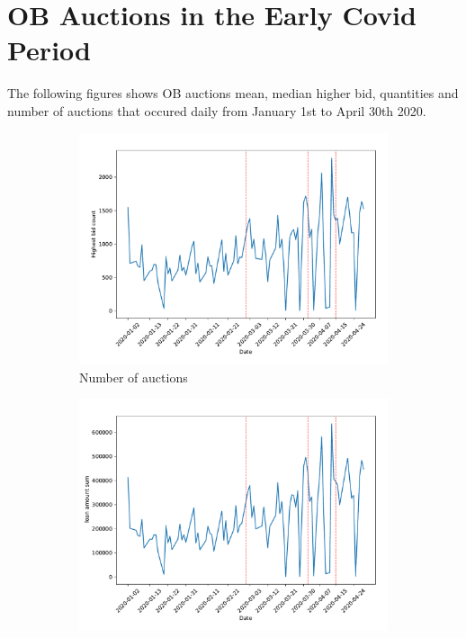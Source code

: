\documentclass[11pt,a4paper]{article}
\begin{document}
\pagebreak
\section{OB Auctions in the Early Covid Period}

The following figures shows OB auctions mean, median higher bid, quantities and number of auctions that occured daily from January 1st to April 30th 2020.

\begin{figure}[h]
  \centering
  \begin{subfigure}[b]{0.49\textwidth}
      \includegraphics[width=0.998\textwidth]{../results/figures/winner_bid_count_mat30_loan1_timeseries_nr_1_7.pdf}
      \caption{ Number of auctions}
     \end{subfigure}
     \begin{subfigure}[b]{0.49\textwidth}
      \includegraphics[width=0.998\textwidth]{../results/figures/LoanAmount_sum_mat30_loan1_timeseries_nr_1_7.pdf}

\end{subfigure}
\end{figure}
\end{document}
